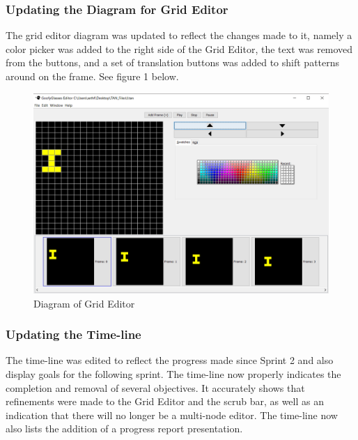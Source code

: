 \documentclass[12pt]{article}
\begin{document}
\begin{appendices}
        \subsubsection {Updating the Diagram for Grid Editor}
          The grid editor diagram was updated to reflect the changes made to it, namely a color picker was added to the right side of the Grid Editor, the text was removed from the buttons, and a set of translation buttons was added to shift patterns around on the frame. See figure 1 below.
        
        \begin{figure}[ht!]
          \centering
          \includegraphics[width=.7\linewidth]{gridEditor_ColorPicker.PNG}
          \caption{Diagram of Grid Editor}
        \end{figure}
      
        \subsubsection {Updating the Time-line}
          The time-line was edited to reflect the progress made since Sprint 2 and also display goals for the following sprint. The time-line now properly indicates the completion and removal of several objectives. It accurately shows that refinements were made to the Grid Editor and the scrub bar, as well as an indication that there will no longer be a multi-node editor. The time-line now also lists the addition of a progress report presentation.
      
      

\end{appendices}
\end{document}
